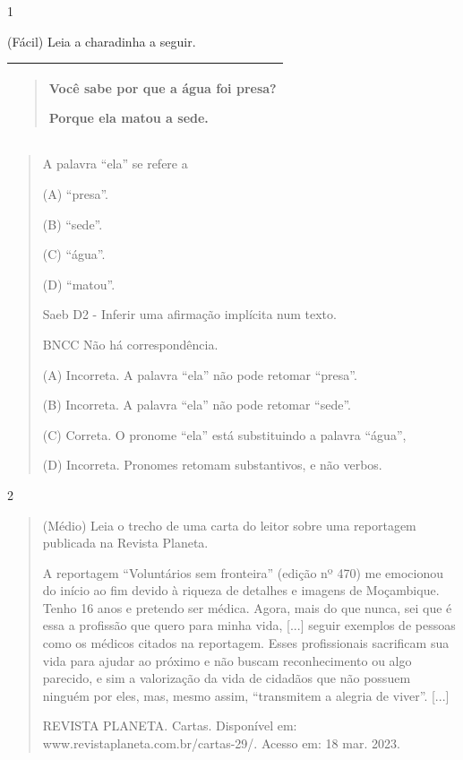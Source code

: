 \begin{escolha}
\num{1}

(Fácil) Leia a charadinha a seguir.

\begin{longtable}[]{@{}l@{}}
\toprule
\begin{minipage}[t]{0.97\columnwidth}\raggedright\strut
\begin{quote}
Você sabe por que a água foi presa?

Porque ela matou a sede.
\end{quote}\strut
\end{minipage}\tabularnewline
\bottomrule
\end{longtable}

\begin{quote}
A palavra ``ela'' se refere a

(A) ``presa''.

(B) ``sede''.

(C) ``água''.

(D) ``matou''.

Saeb D2 - Inferir uma afirmação implícita num texto.

BNCC Não há correspondência.

(A) Incorreta. A palavra ``ela'' não pode retomar ``presa''.

(B) Incorreta. A palavra ``ela'' não pode retomar ``sede''.

(C) Correta. O pronome ``ela'' está substituindo a palavra ``água'',

(D) Incorreta. Pronomes retomam substantivos, e não verbos.
\end{quote}

\num{2}

\begin{quote}
(Médio) Leia o trecho de uma carta do leitor sobre uma reportagem
publicada na Revista Planeta.

A reportagem ``Voluntários sem fronteira'' (edição nº 470) me emocionou
do início ao fim devido à riqueza de detalhes e imagens de Moçambique.
Tenho 16 anos e pretendo ser médica. Agora, mais do que nunca, sei que é
essa a profissão que quero para minha vida, {[}...{]} seguir exemplos de
pessoas como os médicos citados na reportagem. Esses profissionais
sacrificam sua vida para ajudar ao próximo e não buscam reconhecimento
ou algo parecido, e sim a valorização da vida de cidadãos que não
possuem ninguém por eles, mas, mesmo assim, ``transmitem a alegria de
viver''. {[}...{]}

REVISTA PLANETA. Cartas. Disponível em:
www.revistaplaneta.com.br/cartas-29/. Acesso em: 18 mar. 2023.


\end{quote}
\end{escolha}
